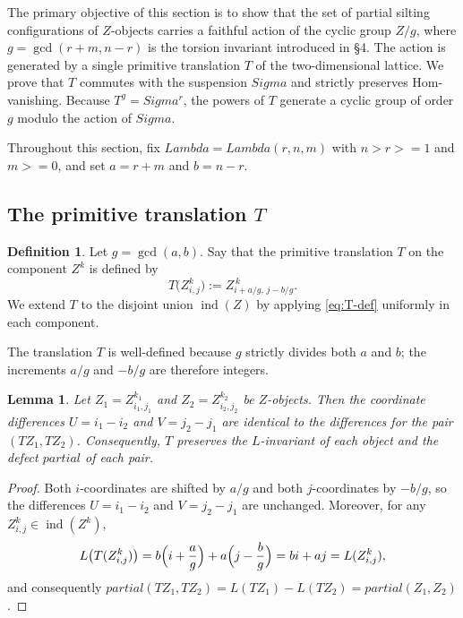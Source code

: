 \documentclass[11pt, a4paper]{article}
\newtheorem{lemma}[theorem]{Lemma}
\theoremstyle{definition}
\newtheorem{definition}[theorem]{Definition}
\def\Lambda{Lambda}%
\def\Sigma{Sigma}%
\def\partial{partial}%
\def\ge{>=}%
\def\mathbb#1{#1}%
\def\mathcal#1{#1}%
\begin{document}
The primary objective of this section is to show that the set of partial silting configurations of $\mathcal Z$-objects carries a faithful action of the cyclic group $\mathbb Z/g$, where $g=\gcd(r+m,n-r)$ is the torsion invariant introduced in \S 4. The action is generated by a single primitive translation $T$ of the two-dimensional lattice. We prove that $T$ commutes with the suspension $\Sigma$ and strictly preserves Hom-vanishing. Because $T^g = \Sigma^r$, the powers of $T$ generate a cyclic group of order $g$ modulo the action of $\Sigma$.

Throughout this section, fix $\Lambda = \Lambda(r,n,m)$ with $n > r \ge 1$ and $m \ge 0$, and set $a = r+m$ and $b = n-r$.

\subsection{The primitive translation \texorpdfstring{$T$}{T}}\label{subsec:Taction-def}

\begin{definition}\label{def:T}
Let $g=\gcd(a, b)$. Say that the primitive translation $T$ on the component $\mathcal Z^k$ is defined by
\begin{equation}\label{eq:T-def}
  T\bigl(Z_{i,j}^k\bigr) := Z_{i+a/g,\, j-b/g}^{\,k}.
\end{equation}
We extend $T$ to the disjoint union $\operatorname{ind}(\mathcal Z)$ by applying \eqref{eq:T-def} uniformly in each component.
\end{definition}

The translation $T$ is well-defined because $g$ strictly divides both $a$ and $b$; the increments $a/g$ and $-b/g$ are therefore integers.

\begin{lemma}\label{lem:T-preserves-diff}
Let $Z_1 = Z_{i_1, j_1}^{k_1}$ and $Z_2 = Z_{i_2, j_2}^{k_2}$ be $\mathcal Z$-objects. Then the coordinate differences $U = i_1 - i_2$ and $V = j_2 - j_1$ are identical to the differences for the pair $(TZ_1, TZ_2)$. Consequently, $T$ preserves the $L$-invariant of each object and the defect $\partial$ of each pair.
\end{lemma}

\begin{proof}
Both $i$-coordinates are shifted by $a/g$ and both $j$-coordinates by $-b/g$, so the differences $U = i_1 - i_2$ and $V = j_2 - j_1$ are unchanged. Moreover, for any $Z_{i,j}^k \in \operatorname{ind}(\mathcal Z^k)$,
\[
L\bigl(T(Z_{i,j}^k)\bigr) = b\Bigl(i + \frac{a}{g}\Bigr) + a\Bigl(j - \frac{b}{g}\Bigr) = bi + aj = L(Z_{i,j}^k),
\]
and consequently $\partial(TZ_1, TZ_2) = L(TZ_1) - L(TZ_2) = \partial(Z_1, Z_2)$.
\end{proof}
\end{document}
